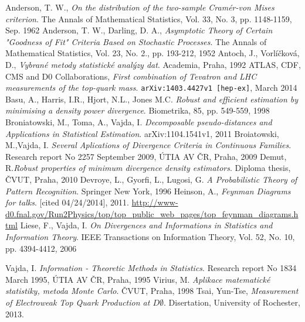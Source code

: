 \begin{thebibliography}{10}

%

Anderson, T. W., {\em On the distribution of the two-sample Cram\'er-von Mises criterion}. The Annals of Mathematical Statistics, Vol. 33, No. 3, pp. 1148-1159, Sep. 1962
Anderson, T. W., Darling, D. A., {\em Asymptotic Theory of Certain "Goodness of Fit" Criteria Based on Stochastic Processes}. The Annals of Mathematical Statistics, Vol. 23, No. 2., pp. 193-212, 1952
Antoch, J., Vorlíčková, D., {\em Vybrané metody statistické analýzy dat}. Academia, Praha, 1992
ATLAS, CDF, CMS and D0 Collaborations, {\em First combination of Tevatron and LHC measurements of the top-quark mass}. \texttt{arXiv:1403.4427v1 [hep-ex]}, March 2014
Basu, A., Harris, I.R., Hjort, N.L., Jones M.C. {\em Robust and efficient estimation by minimising a density power divergence}. Biometrika, 85, pp. 549-559, 1998
Broniatowski, M., Toma, A., Vajda, I. {\em Decomposable pseudo-distances and Applications in Statistical Estimation}. arXiv:1104.1541v1, 2011
Broiatowski, M.,Vajda, I. {\em Several Aplications of Divergence Criteria in Continuous Families}. Research report No 2257 September 2009, ÚTIA AV ČR, Praha, 2009
Demut, R.{\em Robust properties of minimum divergence density estimators}. Diploma thesis, ČVUT, Praha, 2010
Devroye, L., Gyorfi, L., Lugosi, G. {\em A Probabilistic Theory of Pattern Recognition}. Springer New York, 1996
Heinson, A., {\em Feynman Diagrams for talks}. [cited 04/24/2014], 2011. \newline \url{http://www-d0.fnal.gov/Run2Physics/top/top_public_web_pages/top_feynman_diagrams.html} 
Liese, F., Vajda, I. {\em On Divergences and Informations in Statistics and Information Theory}. IEEE Transactions on Information Theory, Vol. 52, No. 10, pp. 4394-4412, 2006


Vajda, I. {\em Information - Theoretic Methods in Statistics}. Research report No 1834 March 1995, ÚTIA AV ČR, Praha, 1995
Virius, M. {\em Aplikace matematické statistiky, metoda Monte Carlo}. ČVUT, Praha, 1998
Tsai, Yun-Tse, {\em Measurement of Electroweak Top Quark Production at $D\mathit{\emptyset}$}. Disertation, University of Rochester, 2013.
\end{thebibliography}